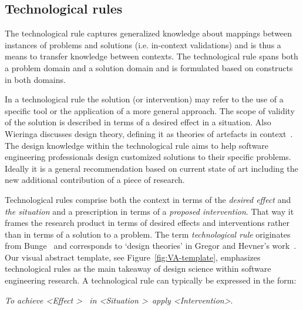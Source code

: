 \documentclass[graybox]{svmult}
\begin{document}
\subsection{Technological rules}
\label{sec:technologicalrules}



The technological rule captures generalized knowledge about mappings between instances of problems and solutions (i.e. in-context validations) and is thus a means to transfer knowledge between contexts. The technological rule spans both a problem domain and a solution domain and is formulated based on constructs in both domains. 

In a technological rule the solution (or intervention) may refer to the use of a specific tool or the application of a more general approach. The scope of validity of the solution is described in terms of a desired effect in a situation.  Also Wieringa discusses design theory, defining it as theories of artefacts in context~\cite{wieringa_design_2009}. The design knowledge within the technological rule aims to help software engineering professionals design customized solutions to their specific problems. Ideally it is a general recommendation based on current state of art including the new additional contribution of a piece of research.

Technological rules comprise both the context in terms of the \emph{desired effect} and \emph{the situation} and a prescription in terms of a \emph{proposed intervention}. That way it frames the research product in terms of desired effects and interventions rather than in terms of a solution to a problem. The term \emph{technological rule} originates from Bunge~\cite{bunge_philosophy_1998} and corresponds to `design theories' in Gregor and Hevner's work~\cite{gregor_positioning_2013}. Our visual abstract template,  see Figure~\ref{fig:VA-template}, emphasizes technological rules as the main takeaway of design science within software engineering research. A technological rule can typically be expressed in the form: 

\begin{center}{\emph{To achieve \textless Effect \textgreater ~ in \textless Situation \textgreater~apply \textless Intervention\textgreater}.} 
\newline
\end{center}
\end{document}
